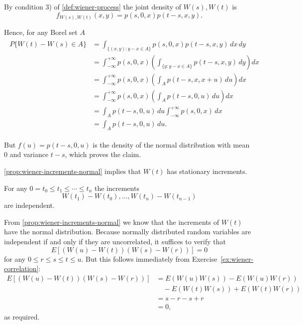 \begin{Proof}
By condition 3) of \cref{def:wiener-process} the joint density of $W(s), W(t)$ is
\[
f_{W(s), W(t)}(x, y) = p(s, 0, x) p(t - s, x, y).
\]

Hence, for any Borel set $A$
\begin{align}
\begin{aligned}
P\{W(t) - W(s) \in A\} &= \int_{\{(x,y): y-x \in A\}} p(s, 0, x) p(t - s, x, y) \, dx \, dy \\
&= \int_{-\infty}^{+\infty} p(s, 0, x) \left(\int_{\{y: y-x \in A\}} p(t - s, x, y) \, dy\right) dx \\
&= \int_{-\infty}^{+\infty} p(s, 0, x) \left(\int_A p(t - s, x, x+u) \, du\right) dx \\
&= \int_{-\infty}^{+\infty} p(s, 0, x) \left(\int_A p(t - s, 0, u) \, du\right) dx \\
&= \int_A p(t - s, 0, u) \, du \int_{-\infty}^{+\infty} p(s, 0, x) \, dx \\
&= \int_A p(t - s, 0, u) \, du.
\end{aligned}
\end{align}

But $f(u) = p(t - s, 0, u)$ is the density of the normal distribution with mean 0 and variance $t - s$, which proves the claim.
\end{Proof}

\begin{Corollary}
\label{cor:wiener-stationary-increments}
\cref{prop:wiener-increments-normal} implies that $W(t)$ has stationary increments.
\end{Corollary}

\begin{Proposition}
\label{prop:wiener-independent-increments}
For any $0 = t_0 \leq t_1 \leq \cdots \leq t_n$ the increments
\[
W(t_1) - W(t_0), \ldots, W(t_n) - W(t_{n-1})
\]
are independent.
\end{Proposition}

\begin{Proof}
From \cref{prop:wiener-increments-normal} we know that the increments of $W(t)$ have the normal distribution. Because normally distributed random variables are independent if and only if they are uncorrelated, it suffices to verify that
\[
E[(W(u) - W(t))(W(s) - W(r))] = 0
\]
for any $0 \leq r \leq s \leq t \leq u$. But this follows immediately from Exercise~\ref{ex:wiener-correlation}:
\begin{equation}
\begin{aligned}
E[(W(u) - W(t))(W(s) - W(r))] &= E(W(u)W(s)) - E(W(u)W(r)) \\
&\quad - E(W(t)W(s)) + E(W(t)W(r)) \\
&= s - r - s + r \\
&= 0,
\end{aligned}
\end{equation}
as required.
\end{Proof}

